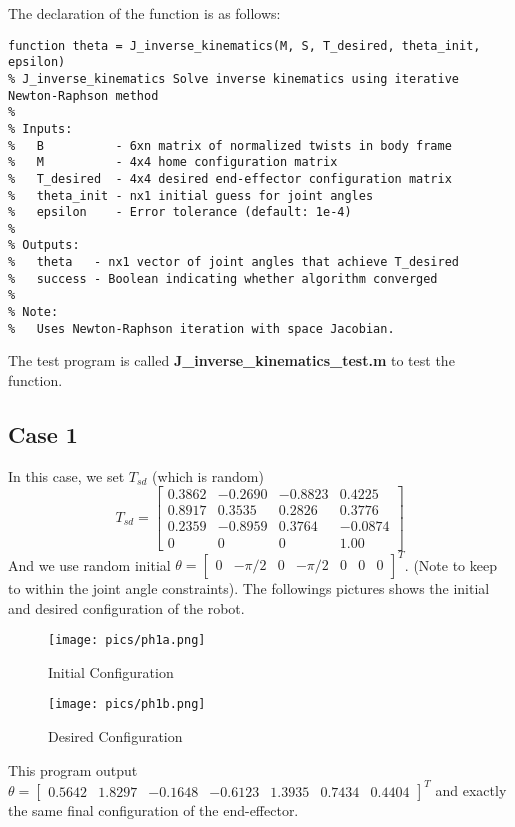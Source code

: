 \documentclass[english,10pt,a4paper]{book}
\begin{document}
    The declaration of the function is as follows:
    \begin{lstlisting}[style=matlab]
function theta = J_inverse_kinematics(M, S, T_desired, theta_init, epsilon)
% J_inverse_kinematics Solve inverse kinematics using iterative Newton-Raphson method
%
% Inputs:
%   B          - 6xn matrix of normalized twists in body frame
%   M          - 4x4 home configuration matrix
%   T_desired  - 4x4 desired end-effector configuration matrix
%   theta_init - nx1 initial guess for joint angles
%   epsilon    - Error tolerance (default: 1e-4)
%
% Outputs:
%   theta   - nx1 vector of joint angles that achieve T_desired
%   success - Boolean indicating whether algorithm converged
%
% Note:
%   Uses Newton-Raphson iteration with space Jacobian.
    \end{lstlisting}
    The test program is called \textbf{J\_inverse\_kinematics\_test.m} to test the function.
    \subsection*{Case 1}
    In this case, we set $T_{sd}$ (which is random)
    \begin{equation}
        T_{sd} = \begin{bmatrix}
            0.3862 & -0.2690 & -0.8823 & 0.4225\\
            0.8917 & 0.3535 & 0.2826 & 0.3776\\
            0.2359 & -0.8959 & 0.3764 &  -0.0874\\
            0 & 0 & 0 & 1.00
        \end{bmatrix}
    \end{equation}
    And we use random initial \(\theta = \begin{bmatrix}
        0 & -\pi/2 & 0 & -\pi/2 & 0 & 0 & 0 \end{bmatrix}^T\). (Note to keep to within the joint angle constraints). The followings pictures shows the initial and desired configuration of the robot.
    \begin{figure}[H]
        \centering
        \begin{minipage}{0.45\textwidth}
            \centering
            \texttt{[image: pics/ph1a.png]} %
            \caption{Initial Configuration}
            \label{fig:ph1a}
        \end{minipage}
        \hfill
        \begin{minipage}{0.45\textwidth}
        \centering
            \texttt{[image: pics/ph1b.png]} %
            \caption{Desired Configuration}
            \label{fig:ph1b}
        \end{minipage}
    \end{figure}
    This program output \(\theta = \begin{bmatrix} 0.5642 & 1.8297 & -0.1648 & -0.6123 & 1.3935 & 0.7434 & 0.4404 \end{bmatrix}^T\) and exactly the same final configuration of the end-effector.
    
\end{document}
